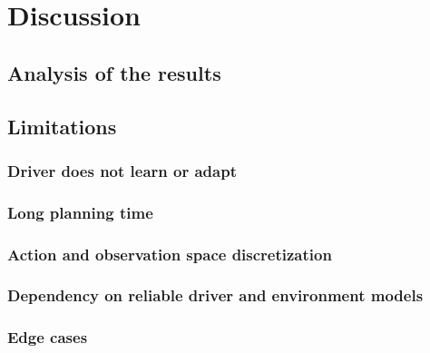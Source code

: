 \chapter{Discussion}
\label{sec:discussion}

\section{Analysis of the results}

\section{Limitations}
\subsection{Driver does not learn or adapt}
\subsection{Long planning time}
\subsection{Action and observation space discretization}
\subsection{Dependency on reliable driver and environment models}
\subsection{Edge cases}